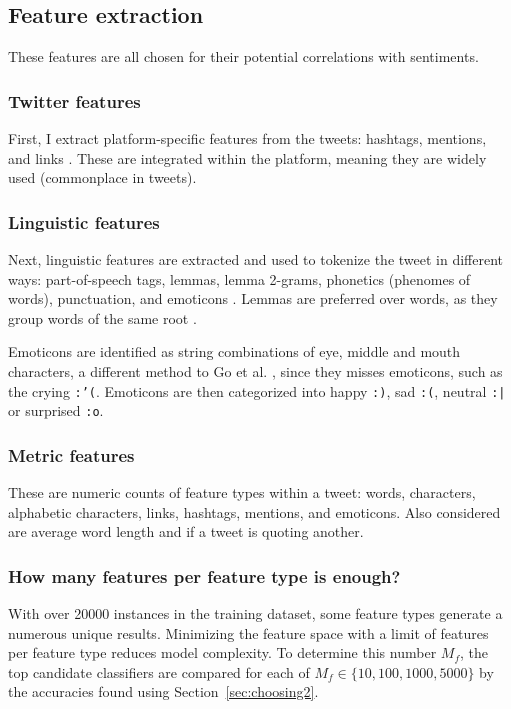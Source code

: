\documentclass[11pt]{article}
\begin{document}
\subsection{Feature extraction}

These features are all chosen for their potential correlations with sentiments.

\subsubsection{{T}witter features}

First, I extract platform-specific features from the tweets: 
hashtags, mentions, and links \cite{go09,robustnoisy10}.
These are integrated within the platform, meaning they are widely used (commonplace in tweets).

\subsubsection{Linguistic features}

Next, linguistic features are extracted and used to tokenize the tweet in different ways: 
part-of-speech tags, lemmas, lemma 2-grams, phonetics (phenomes of words), punctuation, and emoticons \cite{robustnoisy10,nltk,cmudict}.
Lemmas are preferred over words, as they group words of the same root \cite{nltk}.


Emoticons are identified as string combinations of eye, middle and mouth characters,
a different method to Go et al. ,
since they misses emoticons, such as the crying \texttt{:'(}.
Emoticons are then categorized into happy \texttt{:)}, sad \texttt{:(}, neutral \texttt{:|} or surprised \texttt{:o}.

\subsubsection{Metric features}

These are numeric counts of feature types within a tweet: words, characters, alphabetic characters, links, hashtags, mentions, and emoticons.
Also considered are average word length and if a tweet is quoting another.

\subsubsection{How many features per feature type is enough?}

With over 20000 instances in the training dataset, some feature types generate a numerous unique results.
Minimizing the feature space with a limit of features per feature type reduces model complexity.
To determine this number $M_f$, the top candidate classifiers are compared for each of $M_f \in \lbrace 10, 100, 1000, 5000 \rbrace$ by the accuracies found using Section~\ref{sec:choosing2}.
\end{document}
